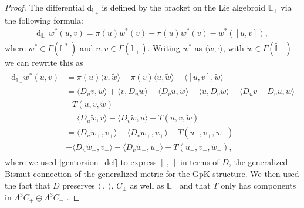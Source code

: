 \documentclass{article}
\newcommand{\rd}{\mathrm{d}}
\newcommand{\Lb}{\mathbb{L}}
\newcommand{\se}{\Gamma}
\newcommand{\la}{\langle}
\newcommand{\ra}{\rangle}
\newcommand{\lara}{\la\ ,\ \ra}
\newcommand{\brac}{[\ ,\ ]}
\def\tl{\tilde}
\theoremstyle{definition}
\theoremstyle{remark}
\begin{document}
\begin{proof}
The differential $\rd_{\Lb_+}$ is defined by the bracket on the Lie algebroid $\Lb_+$ via the following formula:
\begin{align}\label{eq:proof_Liethm}
\rd_{\Lb_+}  w^* (u,v)=\pi(u) w^*(v)-\pi(u) w^*(v)- w^*([u,v]),
\end{align}
where $ w^* \in \se(\Lb_+^*)$ and $u,v\in \se(\Lb_+)$. Writing $ w^*$ as $\la \tl{w},\cdot\ra$, with $\tl{w}\in\se (\tl{\Lb}_+)$ we can rewrite this as
\begin{align}\label{dL}
\begin{aligned}
\rd_{\Lb_+}  w^* (u,v)&=\pi(u)\la v ,\tl{w}\ra-\pi(v)\la u,\tl{w}\ra-\la [u,v],\tl{w}\ra\\
&=\la D_uv,\tl{w}\ra+\la v,D_u \tl{w}\ra-\la D_v u,\tl{w}\ra-\la u,D_v\tl{w}\ra-\la D_uv-D_vu,\tl{w}\ra\\
&+{T}(u,v,\tl{w})\\
&=\la D_u \tl{w},v\ra-\la D_v\tl{w},u\ra+{T}(u,v,\tl{w})\\
&=\la D_u \tl{w}_+,v_+\ra-\la D_v\tl{w}_+,u_+\ra+{T}(u_+,v_+,\tl{w}_+)\\
&+\la D_u \tl{w}_-,v_-\ra-\la D_v\tl{w}_-,u_-\ra+{T}(u_-,v_-,\tl{w}_-),
\end{aligned}
\end{align}
where we used \eqref{gentorsion_def} to express $\brac$ in terms of $D$, the generalized Bismut connection of the generalized metric for the GpK structure. We then used the fact that $D$ preserves $\lara$, $C_\pm$ as well as $\Lb_+$ and that $T$ only has components in $\Lambda^3 C_+\oplus\Lambda^3 C_-$ \cite{Gualtieri:2010fd}.


\end{proof}
\end{document}
